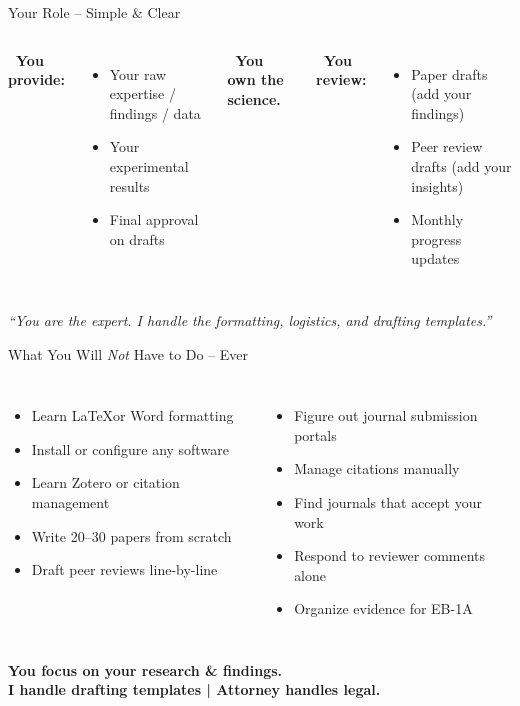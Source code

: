 \documentclass[aspectratio=169, 10pt]{beamer}
\begin{document}
	\begin{frame}{Your Role -- Simple \& Clear}
		\begin{columns}[T]
			\textbf{\faUserCheck \ You provide:}
			\begin{itemize}
				\item Your raw expertise / findings / data
				\item Your experimental results
				\item Final approval on drafts
			\end{itemize}
			
			\vspace{0.5cm}
			\textbf{\faCheckDouble \ You own the science.}
			
			\textbf{\faTasks \ You review:}
			\begin{itemize}
				\item Paper drafts (add your findings)
				\item Peer review drafts (add your insights)
				\item Monthly progress updates
			\end{itemize}
		\end{columns}
		
		\vspace{0.3cm}
		\centering
		\textcolor{accentgold}{\textit{``You are the expert. I handle the formatting, logistics, and drafting templates.''}}
	\end{frame}
	
	\begin{frame}{What You Will \textit{Not} Have to Do -- Ever}
		\begin{columns}[T]
			\begin{itemize}
				\item Learn \LaTeX or Word formatting
				\item Install or configure any software
				\item Learn Zotero or citation management
				\item Write 20--30 papers from scratch
				\item Draft peer reviews line-by-line
			\end{itemize}
			\begin{itemize}
				\item Figure out journal submission portals
				\item Manage citations manually
				\item Find journals that accept your work
				\item Respond to reviewer comments alone
				\item Organize evidence for EB-1A
			\end{itemize}
		\end{columns}
		
		\vspace{0.5cm}
		\centering
		\textbf{\Large You focus on your research \& findings.} \\
		\textbf{\Large I handle drafting templates | Attorney handles legal.}
	\end{frame}
	
\end{document}
